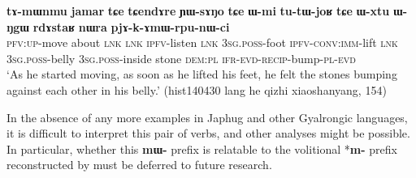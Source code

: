 \documentclass[oneside,a4paper,11pt]{article}
\newcommand{\ipa}[1]{\textbf{{\phon\mbox{#1}}}} %
\begin{document}
\begin{exe}
\ex \label{ex:tAmWnmu}
\gll 
\ipa{tɤ-mɯnmu} \ipa{jamar} 	\ipa{tɕe} 	\ipa{tɕendɤre} 	\ipa{ɲɯ-sɤŋo} 	\ipa{tɕe} 	\ipa{ɯ-mi} 	\ipa{tu-tɯ-joʁ} 	\ipa{tɕe} 	\ipa{ɯ-xtu} 	\ipa{ɯ-ŋgɯ} 	\ipa{rdɤstaʁ} 	\ipa{nɯra} 	\ipa{pjɤ-k-ɤmɯ-rpu-nɯ-ci} \\
\textsc{pfv:up}-move about \textsc{lnk} \textsc{lnk} \textsc{ipfv}-listen \textsc{lnk} \textsc{3sg.poss}-foot \textsc{ipfv-conv:imm}-lift \textsc{lnk} \textsc{3sg.poss}-belly \textsc{3sg.poss}-inside stone \textsc{dem:pl} \textsc{ifr-evd-recip}-bump-\textsc{pl-evd} \\
\glt `As he started moving, as soon as he lifted his feet, he felt the stones bumping against each other in his belly.' (hist140430 lang he qizhi xiaoshanyang, 154)
\end{exe}



In the absence of any more examples in Japhug and other Gyalrongic languages, it is difficult to interpret this pair of verbs, and other analyses might be possible. In particular, whether this \ipa{mɯ-} prefix is relatable to the volitional *\ipa{m-} prefix reconstructed by \citet[55]{bs14oc} must be deferred to future research.



\end{document}
